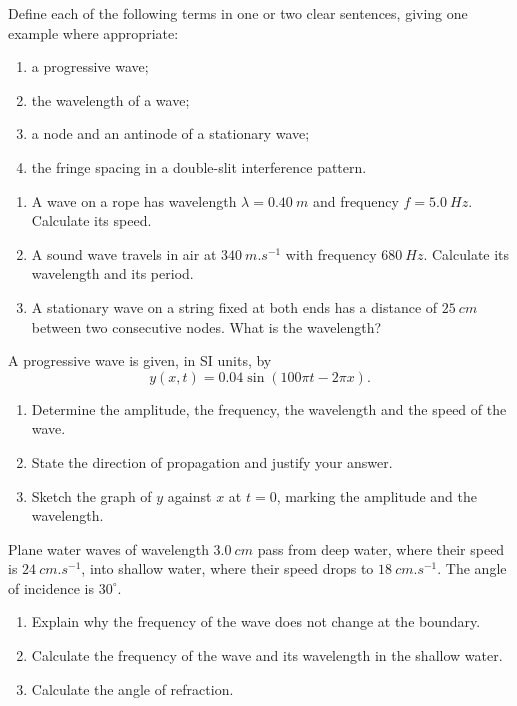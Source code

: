 \documentclass[11pt]{article}
\newcounter{popsec}
\newcounter{popsub}
\newcommand{\courssub}[1]{%
  \stepcounter{popsub}%
  \par\vspace{9pt}\noindent{\popxbold\fontsize{11.5}{13}\selectfont\color{popink}{\color{poporange}\thepopsec.\thepopsub}\hspace{6pt}#1}\par\nopagebreak\vspace{4pt}
}
\begin{document}
\begin{exercice}[Definitions]
Define each of the following terms in one or two clear sentences, giving one example where appropriate:
\begin{enumerate}
\item a progressive wave;
\item the wavelength of a wave;
\item a node and an antinode of a stationary wave;
\item the fringe spacing in a double-slit interference pattern.
\end{enumerate}
\end{exercice}

\begin{exercice}
\begin{enumerate}
\item A wave on a rope has wavelength $\lambda = \SI{0.40}{m}$ and frequency $f = \SI{5.0}{Hz}$. Calculate its speed.
\item A sound wave travels in air at $\SI{340}{m.s^{-1}}$ with frequency $\SI{680}{Hz}$. Calculate its wavelength and its period.
\item A stationary wave on a string fixed at both ends has a distance of $\SI{25}{cm}$ between two consecutive nodes. What is the wavelength?
\end{enumerate}
\end{exercice}

\courssub{I practise}

\begin{exercice}
A progressive wave is given, in SI units, by
\[ y(x,t) = 0.04\sin(100\pi t - 2\pi x). \]
\begin{enumerate}
\item Determine the amplitude, the frequency, the wavelength and the speed of the wave.
\item State the direction of propagation and justify your answer.
\item Sketch the graph of $y$ against $x$ at $t = 0$, marking the amplitude and the wavelength.
\end{enumerate}
\end{exercice}

\begin{exercice}
Plane water waves of wavelength $\SI{3.0}{cm}$ pass from deep water, where their speed is $\SI{24}{cm.s^{-1}}$, into shallow water, where their speed drops to $\SI{18}{cm.s^{-1}}$. The angle of incidence is $30^\circ$.
\begin{enumerate}
\item Explain why the frequency of the wave does not change at the boundary.
\item Calculate the frequency of the wave and its wavelength in the shallow water.
\item Calculate the angle of refraction.
\end{enumerate}
\end{exercice}
\end{document}
